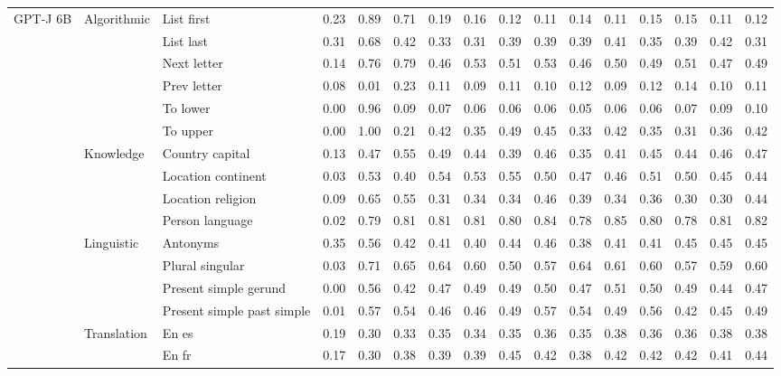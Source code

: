 \begin{center}
\begin{longtable}{lllrrrrrrrrrrrrr}
\multirow[t]{18}{*}{GPT-J 6B} & \multirow[t]{6}{*}{Algorithmic} & List first & 0.23 & 0.89 & 0.71 & 0.19 & 0.16 & 0.12 & 0.11 & 0.14 & 0.11 & 0.15 & 0.15 & 0.11 & 0.12 \\
 &  & List last & 0.31 & 0.68 & 0.42 & 0.33 & 0.31 & 0.39 & 0.39 & 0.39 & 0.41 & 0.35 & 0.39 & 0.42 & 0.31 \\
 &  & Next letter & 0.14 & 0.76 & 0.79 & 0.46 & 0.53 & 0.51 & 0.53 & 0.46 & 0.50 & 0.49 & 0.51 & 0.47 & 0.49 \\
 &  & Prev letter & 0.08 & 0.01 & 0.23 & 0.11 & 0.09 & 0.11 & 0.10 & 0.12 & 0.09 & 0.12 & 0.14 & 0.10 & 0.11 \\
 &  & To lower & 0.00 & 0.96 & 0.09 & 0.07 & 0.06 & 0.06 & 0.06 & 0.05 & 0.06 & 0.06 & 0.07 & 0.09 & 0.10 \\
 &  & To upper & 0.00 & 1.00 & 0.21 & 0.42 & 0.35 & 0.49 & 0.45 & 0.33 & 0.42 & 0.35 & 0.31 & 0.36 & 0.42 \\
\cline{2-16}
 & \multirow[t]{4}{*}{Knowledge} & Country capital & 0.13 & 0.47 & 0.55 & 0.49 & 0.44 & 0.39 & 0.46 & 0.35 & 0.41 & 0.45 & 0.44 & 0.46 & 0.47 \\
 &  & Location continent & 0.03 & 0.53 & 0.40 & 0.54 & 0.53 & 0.55 & 0.50 & 0.47 & 0.46 & 0.51 & 0.50 & 0.45 & 0.44 \\
 &  & Location religion & 0.09 & 0.65 & 0.55 & 0.31 & 0.34 & 0.34 & 0.46 & 0.39 & 0.34 & 0.36 & 0.30 & 0.30 & 0.44 \\
 &  & Person language & 0.02 & 0.79 & 0.81 & 0.81 & 0.81 & 0.80 & 0.84 & 0.78 & 0.85 & 0.80 & 0.78 & 0.81 & 0.82 \\
\cline{2-16}
 & \multirow[t]{4}{*}{Linguistic} & Antonyms & 0.35 & 0.56 & 0.42 & 0.41 & 0.40 & 0.44 & 0.46 & 0.38 & 0.41 & 0.41 & 0.45 & 0.45 & 0.45 \\
 &  & Plural singular & 0.03 & 0.71 & 0.65 & 0.64 & 0.60 & 0.50 & 0.57 & 0.64 & 0.61 & 0.60 & 0.57 & 0.59 & 0.60 \\
 &  & Present simple gerund & 0.00 & 0.56 & 0.42 & 0.47 & 0.49 & 0.49 & 0.50 & 0.47 & 0.51 & 0.50 & 0.49 & 0.44 & 0.47 \\
 &  & Present simple past simple & 0.01 & 0.57 & 0.54 & 0.46 & 0.46 & 0.49 & 0.57 & 0.54 & 0.49 & 0.56 & 0.42 & 0.45 & 0.49 \\
\cline{2-16}
 & \multirow[t]{4}{*}{Translation} & En es & 0.19 & 0.30 & 0.33 & 0.35 & 0.34 & 0.35 & 0.36 & 0.35 & 0.38 & 0.36 & 0.36 & 0.38 & 0.38 \\
 &  & En fr & 0.17 & 0.30 & 0.38 & 0.39 & 0.39 & 0.45 & 0.42 & 0.38 & 0.42 & 0.42 & 0.42 & 0.41 & 0.44 \\

\end{longtable}
\end{center}
